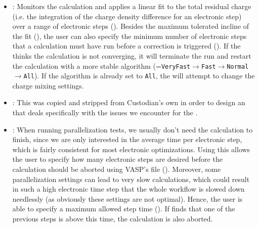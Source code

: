 \begin{refsection}
\begin{itemize} 
 
\item {}: Monitors the calculation and 
applies a linear fit to the total residual charge (i.e. the integration of the 
charge density difference for an electronic step) over a range of electronic 
steps (). Besides the maximum tolerated incline of the 
fit (), the user can also specify the minimum 
number of electronic steps that a calculation must have run before a 
correction is triggered (). If the 
 thinks the calculation is not converging, it will 
terminate the run and restart the calculation with a more stable algorithm 
(=\texttt{VeryFast}$\rightarrow$\texttt{Fast}$\rightarrow$\texttt{Normal}$\rightarrow$\texttt{All}). 
If the algorithm is already set to \texttt{All}, the 
 will attempt to change the charge mixing 
settings. 
 
 
\item {}: This  was copied and 
stripped from Custodian's own  in order to design an 
 that deals specifically with the issues we encounter for 
the . 
 
\item {}: When running parallelization tests, 
we usually don't need the calculation to finish, since we are only interested 
in the average time per electronic step, which is fairly consistent for most 
electronic optimizations. Using this  allows the user to 
specify how many electronic steps are desired before the calculation should be 
aborted using \gls{VASP}'s  file (). 
Moreover, some parallelization settings can lead to very slow calculations, 
which could result in such a high electronic time step that the whole workflow 
is slowed down needlessly (as obviously these settings are not optimal). 
Hence, the user is able to specify a maximum allowed step time 
(). If  finds 
that one of the previous steps is above this time, the calculation is also 
aborted. 
 

\end{itemize}
\end{refsection}
